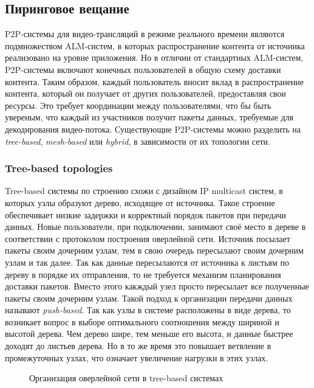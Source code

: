 	\subsection{Пиринговое вещание}
	P2P-системы для видео-трансляций в режиме реального времени являются подмножеством ALM-систем, в которых
	распространение контента от источника реализовано на уровне приложения. Но в отличии от стандартных ALM-систем,
	P2P-системы включают конечных пользователей в общую схему доставки контента. Таким образом, каждый пользователь
	вносит вклад в распространение контента, который он получает от других пользователей, предоставляя свои ресурсы.
	Это требует координации между пользователями, что бы быть увереным, что каждый из участников получит пакеты данных,
	требуемые для декодирования видео-потока. Существующие P2P-системы можно разделить на \textit{tree-based},
	\textit{mesh-based} или \textit{hybrid}, в зависимости от их топологии сети.

		\subsubsection{Tree-based topologies}
		Tree-based системы по строению схожи с дизайном IP multicast систем, в которых узлы образуют дерево, исходящее
		от источника. Такое строение обеспечивает низкие задержки и корректный порядок пакетов при передачи данных.
		Новые пользователи, при подключении, занимают своё место в дереве в соответствии с протоколом построения
		оверлейной сети. Источник посылает пакеты своим дочерним узлам, тем в свою очередь пересылают своим дочерним
		узлам и так далее. Так как данные пересылаются от источника к листьям по дереву в порядке их отправления, то не
		требуется механизм планирования доставки пакетов. Вместо этого какждый узел просто пересылает все полученные
		пакеты своим дочерним узлам. Такой подход к организации передачи данных называют \textit{push-based}. Так как
		узлы в системе расположены в виде дерева, то возникает вопрос в выборе оптимального соотношения между шириной и
		высотой дерева. Чем дерево шире, тем меньше его высота, и данные быстрее доходят до листьев дерева. Но в то же
		время это повышает ветвление в промежуточных узлах, что означает увеличение нагрузки в этих узлах.

		\begin{figure}[h]
			\caption{Организация оверлейной сети в tree-based системах}
			\label{img:tree-based-system}
		\end{figure}

